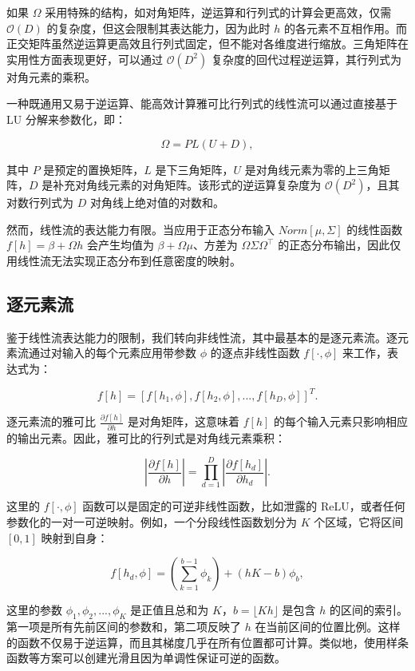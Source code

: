 如果 \(\Omega\) 采用特殊的结构，如对角矩阵，逆运算和行列式的计算会更高效，仅需 \(\mathcal{O}(D)\) 的复杂度，但这会限制其表达能力，因为此时 \(h\) 的各元素不互相作用。而正交矩阵虽然逆运算更高效且行列式固定，但不能对各维度进行缩放。三角矩阵在实用性方面表现更好，可以通过 \(\mathcal{O}(D^2)\) 复杂度的回代过程逆运算，其行列式为对角元素的乘积。

一种既通用又易于逆运算、能高效计算雅可比行列式的线性流可以通过直接基于 LU 分解来参数化，即：

\[
\Omega = PL(U + D), \tag{16.9}
\]

其中 \(P\) 是预定的置换矩阵，\(L\) 是下三角矩阵，\(U\) 是对角线元素为零的上三角矩阵，\(D\) 是补充对角线元素的对角矩阵。该形式的逆运算复杂度为 \(\mathcal{O}(D^2)\)，且其对数行列式为 \(D\) 对角线上绝对值的对数和。

然而，线性流的表达能力有限。当应用于正态分布输入 \(Norm[\mu, \Sigma]\) 的线性函数 \(f[h] = \beta + \Omega h\) 会产生均值为 \(\beta + \Omega \mu\)、方差为 \(\Omega \Sigma \Omega^\top\) 的正态分布输出，因此仅用线性流无法实现正态分布到任意密度的映射。

\subsection{逐元素流}
鉴于线性流表达能力的限制，我们转向非线性流，其中最基本的是逐元素流。逐元素流通过对输入的每个元素应用带参数 \(\phi\) 的逐点非线性函数 \(f[\cdot, \phi]\) 来工作，表达式为：

\[
f[h] = [f[h_1, \phi], f[h_2, \phi], ..., f[h_D, \phi]]^T. \tag{16.10}
\]

逐元素流的雅可比 \(\frac{\partial f[h]}{\partial h}\) 是对角矩阵，这意味着 \(f[h]\) 的每个输入元素只影响相应的输出元素。因此，雅可比的行列式是对角线元素乘积：

\[
\left| \frac{\partial f[h]}{\partial h} \right| = \prod_{d=1}^D \left| \frac{\partial f[h_d]}{\partial h_d} \right|. \tag{16.11}
\]

这里的 \(f[\cdot, \phi]\) 函数可以是固定的可逆非线性函数，比如泄露的 ReLU，或者任何参数化的一对一可逆映射。例如，一个分段线性函数划分为 \(K\) 个区域，它将区间 \([0, 1]\) 映射到自身：

\[
f[h_d, \phi] = \left( \sum_{k=1}^{b-1} \phi_k \right) + (hK - b)\phi_b, \tag{16.12}
\]

这里的参数 \(\phi_1, \phi_2, ..., \phi_K\) 是正值且总和为 \(K\)，\(b = \lfloor Kh \rfloor\) 是包含 \(h\) 的区间的索引。第一项是所有先前区间的参数和，第二项反映了 \(h\) 在当前区间的位置比例。这样的函数不仅易于逆运算，而且其梯度几乎在所有位置都可计算。类似地，使用样条函数等方案可以创建光滑且因为单调性保证可逆的函数。

